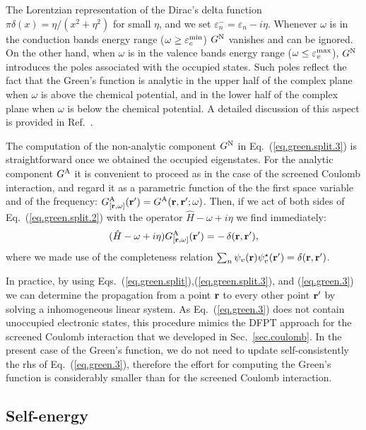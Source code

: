 \documentclass[twocolumn,prb,showpacs,superscriptaddress]{revtex4}
\def\w{\omega}
\def\H{\hat{H}}
\def\E{\varepsilon}
\def\r{{\bf r}}
\def\rp{{\bf r^\prime}}
\begin{document}
The Lorentzian representation of the Dirac's delta function
$\pi\delta(x)=\eta/(x^2+\eta^2)$ for small $\eta$, and we set $\E_n^- = \E_n - i\eta$.
Whenever $\w$ is in the conduction bands energy range ($\w\ge\E_c^{\rm min}$)
$G^{\rm N}$ vanishes and can be ignored.
On the other hand, when $\w$ is in the valence bands energy range ($\w\le\E_v^{\rm max}$),
$G^{\rm N}$ introduces the poles associated with the occupied states.
Such poles reflect the fact that the Green's function is analytic in the upper
half of the complex plane when $\w$ is above the chemical potential, and in the lower half
of the complex plane when $\w$ is below the chemical potential.
A detailed discussion of this aspect is provided in Ref.\ .

The computation of the non-analytic component $G^{\rm N}$ in Eq.\ (\ref{eq.green.split.3})
is straightforward once we obtained the occupied eigenstates.
For the analytic component $G^{\rm A}$ it is convenient to
proceed as in the case of the screened Coulomb interaction,
and regard it as a parametric
function of the the first space variable
and of the frequency: $G^{\rm A}_{[\r,\w]}(\rp) = G^{\rm A}(\r,\rp;\w)$.
Then, if we act of both sides of Eq.\ (\ref{eq.green.split.2})
with the operator $\H-\w + i\eta$ we find immediately:
  \begin{equation}\label{eq.green.3}
  (\H-\w + i\eta) G^{\rm A}_{[\r,\w]}(\rp) = -\, \delta(\r,\rp), 
  \end{equation}
where we made use of the 
completeness relation $\sum_n \psi_v(\r)\psi_v^\star(\rp) = \delta(\r,\rp)$.

In practice, by using Eqs.\ (\ref{eq.green.split}),(\ref{eq.green.split.3}), and
(\ref{eq.green.3}) we can determine the propagation
from a point $\r$ to every other point $\rp$ by solving a inhomogeneous
linear system. As Eq.\ (\ref{eq.green.3}) does not contain unoccupied
electronic states, this procedure mimics the DFPT approach for the
screened Coulomb interaction that we developed in Sec.\ \ref{sec.coulomb}.
In the present case of the Green's function, we do not need to update
self-consistently the rhs of Eq.\ (\ref{eq.green.3}), therefore the
effort for computing the Green's function is considerably smaller
than for the screened Coulomb interaction.

\subsection{Self-energy}\label{sec.sigma}
\end{document}
